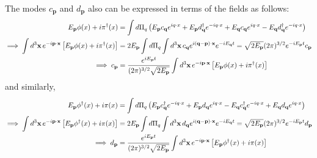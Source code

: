 \documentclass[a4paper,11pt]{article}
\begin{document}
The modes $c_{\mathbf{p}}$ and $d_{\mathbf{p}}$ also can be expressed in terms of the fields as follows:
\begin{align}
    E_{\mathbf{p}}\phi(x) + i\pi^\dagger(x) &= \int d\Pi_q\left(E_{\mathbf{p}}c_{\mathbf{q}}e^{iq\cdot x} + E_{\mathbf{p}}d_{\mathbf{q}}^\dagger e^{-iq\cdot x} + E_{\mathbf{q}}c_{\mathbf{q}}e^{iq\cdot x} - E_{\mathbf{q}}d_{\mathbf{q}}^\dagger e^{-iq\cdot x}\right) \notag\\
    \implies \int d^3\mathbf{x}\, e^{-i\mathbf{p}\cdot\mathbf{x}}\left[E_{\mathbf{p}}\phi(x) + i\pi^\dagger(x)\right] &= 2E_{\mathbf{p}}\int d\Pi_q \int d^3\mathbf{x} \, c_{\mathbf{q}} e^{i(\mathbf{q}-\mathbf{p})\cdot\mathbf{x}} e^{-iE_{\mathbf{q}}t} = \sqrt{2E_{\mathbf{p}}}(2\pi)^{3/2}e^{-iE_{\mathbf{p}}t}c_{\mathbf{p}}\notag\\
    \implies c_{\mathbf{p}} &= \frac{e^{iE_{\mathbf{p}}t}}{(2\pi)^{3/2}\sqrt{2E_{\mathbf{p}}}}\int d^3\mathbf{x}\, e^{-i\mathbf{p}\cdot\mathbf{x}}\left[E_{\mathbf{p}}\phi(x) + i\pi^\dagger(x)\right]
\end{align}
and similarly,
\begin{align}
    E_{\mathbf{p}}\phi^\dagger(x) + i\pi(x) &= \int d\Pi_q\left(E_{\mathbf{p}}c_{\mathbf{q}}^\dagger e^{-iq\cdot x} + E_{\mathbf{p}}d_{\mathbf{q}} e^{iq\cdot x} - E_{\mathbf{q}}c_{\mathbf{q}}^\dagger e^{-iq\cdot x} + E_{\mathbf{q}}d_{\mathbf{q}} e^{iq\cdot x}\right) \notag\\
    \implies \int d^3\mathbf{x}\, e^{-i\mathbf{p}\cdot\mathbf{x}}\left[E_{\mathbf{p}}\phi^\dagger(x) + i\pi(x)\right] &= 2E_{\mathbf{p}}\int d\Pi_q \int d^3\mathbf{x} \, d_{\mathbf{q}} e^{i(\mathbf{q}-\mathbf{p})\cdot\mathbf{x}} e^{-iE_{\mathbf{q}}t} = \sqrt{2E_{\mathbf{p}}}(2\pi)^{3/2}e^{-iE_{\mathbf{p}}t}d_{\mathbf{p}}\notag\\
    \implies d_{\mathbf{p}} &= \frac{e^{iE_{\mathbf{p}}t}}{(2\pi)^{3/2}\sqrt{2E_{\mathbf{p}}}}\int d^3\mathbf{x}\, e^{-i\mathbf{p}\cdot\mathbf{x}}\left[E_{\mathbf{p}}\phi^\dagger(x) + i\pi(x)\right]
\end{align}
\end{document}
